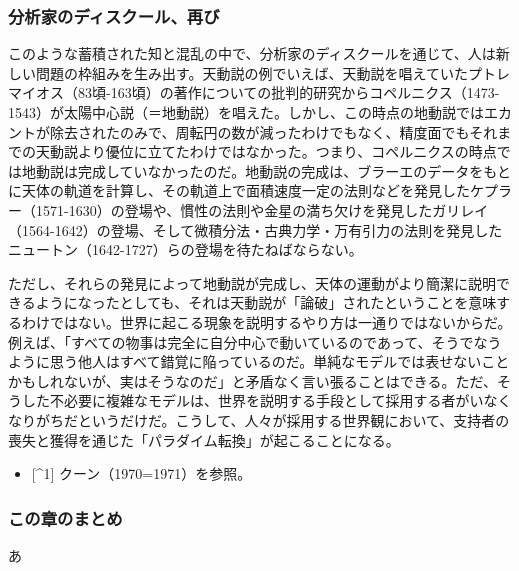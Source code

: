 \subsubsection{分析家のディスクール、再び}\label{ux5206ux6790ux5bb6ux306eux30c7ux30a3ux30b9ux30afux30fcux30ebux518dux3073}

このような蓄積された知と混乱の中で、分析家のディスクールを通じて、人は新しい問題の枠組みを生み出す。天動説の例でいえば、天動説を唱えていたプトレマイオス（83頃-163頃）の著作についての批判的研究からコペルニクス（1473-1543）が太陽中心説（＝地動説）を唱えた。しかし、この時点の地動説ではエカントが除去されたのみで、周転円の数が減ったわけでもなく、精度面でもそれまでの天動説より優位に立てたわけではなかった。つまり、コペルニクスの時点では地動説は完成していなかったのだ。地動説の完成は、ブラーエのデータをもとに天体の軌道を計算し、その軌道上で面積速度一定の法則などを発見したケプラー（1571-1630）の登場や、慣性の法則や金星の満ち欠けを発見したガリレイ（1564-1642）の登場、そして微積分法・古典力学・万有引力の法則を発見したニュートン（1642-1727）らの登場を待たねばならない。

ただし、それらの発見によって地動説が完成し、天体の運動がより簡潔に説明できるようになったとしても、それは天動説が「論破」されたということを意味するわけではない。世界に起こる現象を説明するやり方は一通りではないからだ。例えば、「すべての物事は完全に自分中心で動いているのであって、そうでなうように思う他人はすべて錯覚に陥っているのだ。単純なモデルでは表せないことかもしれないが、実はそうなのだ」と矛盾なく言い張ることはできる。ただ、そうした不必要に複雑なモデルは、世界を説明する手段として採用する者がいなくなりがちだというだけだ。こうして、人々が採用する世界観において、支持者の喪失と獲得を通じた「パラダイム転換」が起こることになる。

\begin{itemize}
\tightlist
\item
  {[}\^{}1{]} クーン（1970=1971）を参照。
\end{itemize}

\subsubsection{この章のまとめ}\label{ux3053ux306eux7ae0ux306eux307eux3068ux3081}

あ
